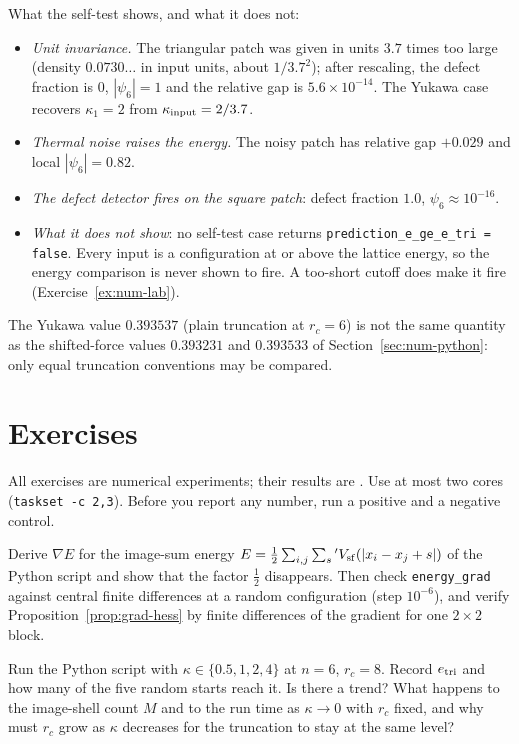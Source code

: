 What the self-test shows, and what it does not:
\begin{itemize}
\item \emph{Unit invariance.} The triangular patch was given in units $3.7$ times too large (density $0.0730\ldots$ in
input units, about $1/3.7^2$); after rescaling, the defect fraction is $0$, $|\psi_6|=1$ and the relative gap is
$5.6\times10^{-14}$. The Yukawa case recovers $\kappa_1=2$ from $\kappa_{\rm input}=2/3.7$.
\item \emph{Thermal noise raises the energy.} The noisy patch has relative gap $+0.029$ and local $|\psi_6|=0.82$.
\item \emph{The defect detector fires on the square patch}: defect fraction $1.0$, $\psi_6\approx10^{-16}$.
\item \emph{What it does not show}: no self-test case returns \texttt{prediction\_e\_ge\_e\_tri = false}. Every input is a
configuration at or above the lattice energy, so the energy comparison is never shown to fire. A too-short cutoff
does make it fire (Exercise~\ref{ex:num-lab}).
\end{itemize}
The Yukawa value $0.393537$ (plain truncation at $r_c=6$) is not the same quantity as the shifted-force values $0.393231$
and $0.393533$ of Section~\ref{sec:num-python}: only equal truncation conventions may be compared.



\section{Exercises}\label{sec:num-ex}
All exercises are numerical experiments; their results are \tierX. Use at most two cores
(\texttt{taskset -c 2,3}). Before you report any number, run a positive and a negative control.

\begin{exercise}[Derivatives]\label{ex:num-grad}
Derive $\nabla E$ for the image-sum energy $E=\frac12\sum_{i,j}\sum_{s}{}'V_{\rm sf}(|x_i-x_j+s|)$ of the Python script
and show that the factor $\frac12$ disappears. Then check \texttt{energy\_grad} against central finite differences at
a random configuration (step $10^{-6}$), and verify Proposition~\ref{prop:grad-hess} by finite differences of the
gradient for one $2\times2$ block.
\end{exercise}

\begin{exercise}
Run the Python script with $\kappa\in\{0.5,1,2,4\}$ at $n=6$, $r_c=8$. Record $e_{\rm tri}$ and how many of the five
random starts reach it. Is there a trend? What happens to the image-shell count $M$ and to the run time as
$\kappa\to0$ with $r_c$ fixed, and why must $r_c$ grow as $\kappa$ decreases for the truncation to stay at the same level?
\end{exercise}


